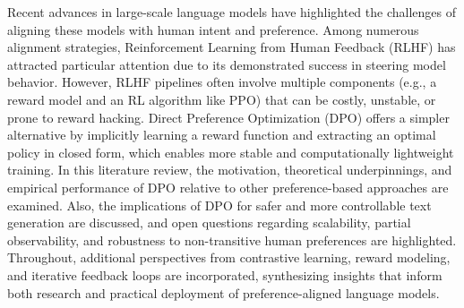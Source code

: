 \documentclass[a4paper,oneside,10pt,ngerman,english]{scrartcl}
\begin{document}

\cleardoubleoddpage
\tableofcontents




\cleardoubleoddpage


Recent advances in large-scale language models have highlighted the challenges of aligning these models with human intent and preference. Among numerous alignment strategies, Reinforcement Learning from Human Feedback (RLHF) has attracted particular attention due to its demonstrated success in steering model behavior. However, RLHF pipelines often involve multiple components (e.g., a reward model and an RL algorithm like PPO) that can be costly, unstable, or prone to reward hacking. Direct Preference Optimization (DPO) offers a simpler alternative by implicitly learning a reward function and extracting an optimal policy in closed form, which enables more stable and computationally lightweight training. In this literature review, the motivation, theoretical underpinnings, and empirical performance of DPO relative to other preference-based approaches are examined. Also, the implications of DPO for safer and more controllable text generation are discussed, and open questions regarding scalability, partial observability, and robustness to non-transitive human preferences are highlighted. Throughout, additional perspectives from contrastive learning, reward modeling, and iterative feedback loops are incorporated, synthesizing insights that inform both research and practical deployment of preference-aligned language models.
\end{document}
